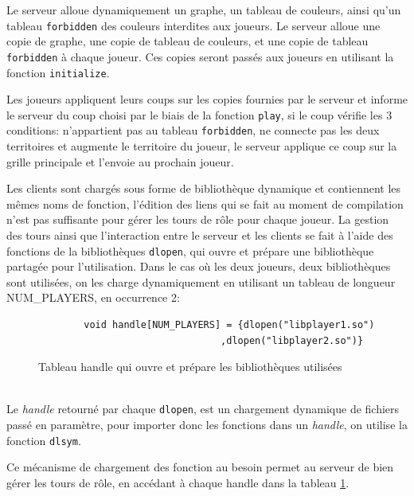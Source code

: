 \documentclass[11pt]{article}
\begin{document}
\par
Le serveur alloue dynamiquement un graphe, un tableau de couleurs, ainsi qu'un tableau \texttt{forbidden} des couleurs interdites aux joueurs. Le serveur alloue une copie de graphe, une copie de tableau de couleurs, et une copie de tableau \texttt{forbidden} à chaque joueur. Ces copies seront passés aux joueurs en utilisant la fonction \texttt{initialize}.\\


\par
Les joueurs appliquent leurs coups sur les copies fournies par le serveur et informe le serveur du coup choisi par le biais de la fonction \texttt{play}, si le coup vérifie les 3 conditions: n'appartient pas au tableau \texttt{forbidden}, ne connecte pas les deux territoires et augmente le territoire du joueur, le serveur applique ce coup sur la grille principale et l'envoie au prochain joueur.\\


\par
Les clients sont chargés sous forme de bibliothèque dynamique et contiennent les mêmes noms de fonction, l'édition des liens qui se fait au moment de compilation n'est pas suffisante pour gérer les tours de rôle pour chaque joueur. La gestion des tours ainsi que l'interaction entre le serveur et les clients se fait à l'aide des fonctions de la bibliothèques \texttt{dlopen}, qui ouvre et prépare une bibliothèque partagée pour l'utilisation. Dans le cas où les deux joueurs, deux bibliothèques sont utilisées, on les charge dynamiquement en utilisant un tableau de longueur NUM\_PLAYERS, en occurrence 2:
\begin{figure}[h!]
    \begin{lstlisting}
        void handle[NUM_PLAYERS] = {dlopen("libplayer1.so")
                                ,dlopen("libplayer2.so")}
    \end{lstlisting}
    \caption{Tableau handle qui ouvre et prépare les bibliothèques utilisées}
    \label{fig:handle}
\end{figure}
\\


Le \textit{handle} retourné par chaque \texttt{dlopen}, est un chargement dynamique de fichiers passé en paramètre, pour importer donc les fonctions dans un \textit{handle}, on utilise la fonction \texttt{dlsym}.\\
\par


Ce mécanisme de chargement des fonction au besoin permet au serveur de bien gérer les tours de rôle, en accédant à chaque handle dans la tableau \ref{fig:handle}.\\
\par
\end{document}
